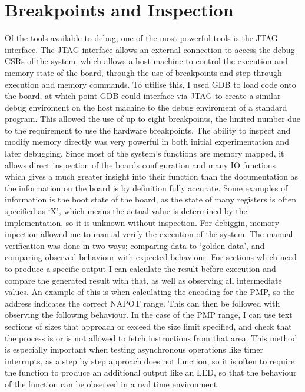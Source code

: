 \section{Breakpoints and Inspection}
Of the tools available to debug, one of the most powerful tools is the JTAG interface. The JTAG interface allows an external connection to access the debug CSRs of the system, which allows a host machine to control the execution and memory state of the board, through the use of breakpoints and step through execution and memory commands. To utilise this, I used GDB to load code onto the board, at which point GDB could interface via JTAG to create a similar debug enviroment on the host machine to the debug enviroment of a standard program. This allowed the use of up to eight breakpoints, the limited number due to the requirement to use the hardware breakpoints. The ability to inspect and modify memory directly was very powerful in both initial experimentation and later debugging. Since most of the system's functions are memory mapped, it allows direct inspection of the boards configuration and many IO functions, which gives a much greater insight into their function than the documentation as the information on the board is by definition fully accurate. Some examples of information is the boot state of the board, as the state of many registers is often specified as `X', which means the actual value is determined by the implementation, so it is unknown without inspection. For debiggin, memory inpection allowed me to manual verify the execution of the system. The manual verification was done in two ways; comparing data to `golden data', and comparing observed behaviour with expected behaviour. For sections which need to produce a specific output I can calculate the result before execution and compare the generated result with that, as well as observing all intermediate values. An example of this is when calculating the encoding for the PMP, so the address indicates the correct NAPOT range. This can then be followed with observing the following behaviour. In the case of the PMP range, I can use text sections of sizes that approach or exceed the size limit specified, and check that the process is or is not allowed to fetch instructions from that area. This method is especially important when testing asynchronous operations like timer interrupts, as a step by step approach does not function, so it is often to require the function to produce an additional output like an LED, so that the behaviour of the function can be observed in a real time environment.

